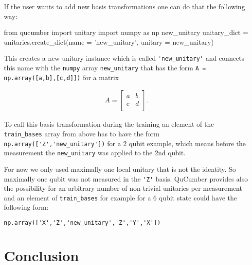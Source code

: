 \documentclass[submission, Phys]{SciPost}
\begin{document}
If the user wants to add new basis transformations one can do that the following way:

\begin{python}
from qucumber import unitary
import numpy as np
new_unitary
unitary_dict = unitaries.create_dict(name = 'new_unitary', unitary = new_unitary)
\end{python}

This creates a new unitary instance which is called \verb|'new_unitary'| and connects this name with the \verb|numpy| array 
\verb|new_unitary| that has the form \verb|A = np.array([a,b],[c,d]])| for a matrix 

\begin{align}
A = 
\begin{bmatrix}
a &b \\
c &d \\ 
\end{bmatrix}.
\end{align} 

To call this basis transformation during the training an element of the \verb|train_bases| array from above has to have the form 
\verb|np.array(['Z','new_unitary'])| for a 2 qubit example, which means before the measurement the \verb|new_unitary| was applied to the 2nd qubit.

For now we only used maximally one local unitary that is not the identity. So maximally one qubit was not measured in the \verb|'Z'| basis. QuCumber provides also the possibility for an arbitrary number of non-trivial unitaries per measurement and an element of  \verb|train_bases| for example for a 6 qubit state could have the following form:

\verb|np.array(['X','Z','new_unitary','Z','Y','X'])|

%

\section{Conclusion}
\end{document}
